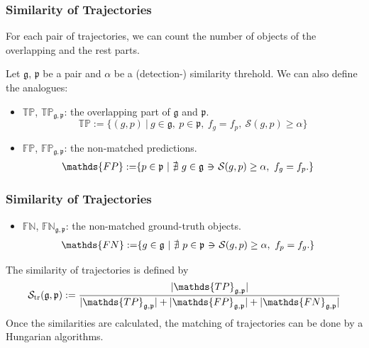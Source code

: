 \documentclass[slidetop, mathserif, dvipsnames]{beamer}
\newcommand{\suchthat}{-\hspace{-10pt}\ni\hspace{-10pt}-}
\begin{document}
\begin{frame}
	\frametitle{Similarity of Trajectories}
			
	For each pair of trajectories,
	we can count the number of objects of the overlapping and the rest parts.
			
	\vspace{5pt}
			
	Let $\mathfrak g$, $\mathfrak p$ be a pair
	and $\alpha$ be a (detection-) similarity threhold.
	We can also define the analogues:

	\vspace{5pt}

	\begin{itemize}
		\item $\mathds{TP}$, $\mathds{TP}_{\mathfrak g, \mathfrak p}$:
		      the overlapping part of $\mathfrak g$ and $\mathfrak p$.
		      \[
		      	\mathds{TP} := \{(g,p)\ |\ 
		      	g\in\mathfrak g,~
		      	p\in\mathfrak p,~
		      	f_g=f_p,~ \mathcal S(g,p)\geq \alpha\}
		      \]
		\item $\mathds{FP}$, $\mathds{FP}_{\mathfrak g, \mathfrak p}$:
		      the non-matched predictions.
		      \begin{align*}
		      	\mathds{FP} := & \{ p\in\mathfrak p\ |\ 
		      	\nexists\ g\in\mathfrak g ~\suchthat~ \mathcal S(g,p)\geq\alpha,~ f_g=f_p.\}
		      \end{align*}
	\end{itemize}
			
\end{frame}

\begin{frame}
	\frametitle{Similarity of Trajectories}
			
	\begin{itemize}
		\item $\mathds{FN}$, $\mathds{FN}_{\mathfrak g, \mathfrak p}$: the non-matched ground-truth objects.
		      \begin{align*}
		      	\mathds{FN} := & \{ g\in\mathfrak g\ |\ 
		      	\nexists\ p\in\mathfrak p ~\suchthat~ \mathcal S(g,p)\geq\alpha,~ f_p=f_g.\}
		      \end{align*}
	\end{itemize}
			
	The similarity of trajectories is defined by
	\[
		\mathcal S_{\rm tr}(\mathfrak g, \mathfrak p) :=
		\dfrac{|\mathds{TP}_{\mathfrak g,\mathfrak p}|}{
			|\mathds{TP}_{\mathfrak g,\mathfrak p}|+|\mathds{FP}_{\mathfrak g,\mathfrak p}|+|\mathds{FN}_{\mathfrak g,\mathfrak p}|
		}
	\]
	Once the similarities are calculated,
	the matching of trajectories can be done by a Hungarian algorithms.
\end{frame}
\end{document}
